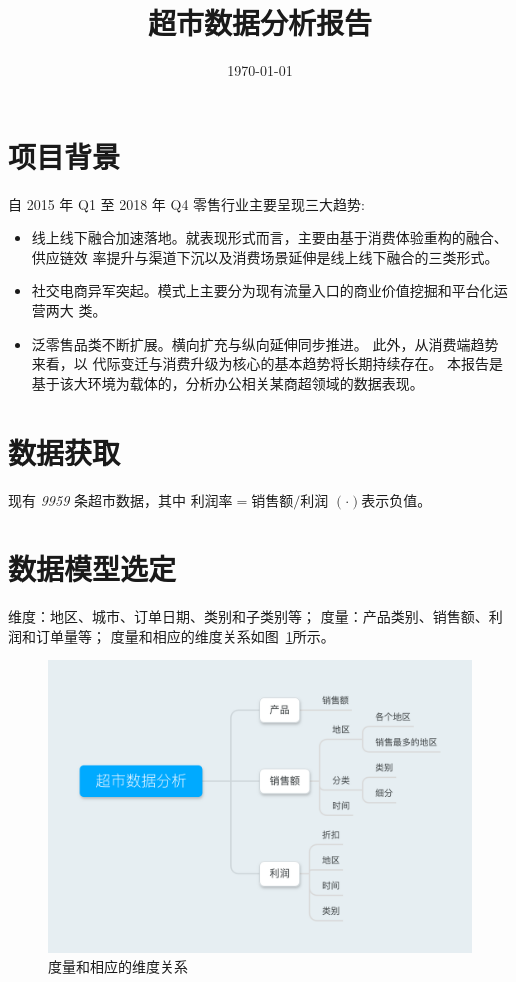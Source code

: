 \documentclass[a4paper]{ctexart}
\title{超市数据分析报告}
\author{}
\date{\today}
\begin{document}
\maketitle
\tableofcontents
\section{项目背景}
自 2015 年 Q1 至 2018 年 Q4 零售行业主要呈现三大趋势:
\begin{itemize}
    \item 线上线下融合加速落地。就表现形式而言，主要由基于消费体验重构的融合、供应链效
          率提升与渠道下沉以及消费场景延伸是线上线下融合的三类形式。
    \item 社交电商异军突起。模式上主要分为现有流量入口的商业价值挖掘和平台化运营两大
          类。
    \item 泛零售品类不断扩展。横向扩充与纵向延伸同步推进。 此外，从消费端趋势来看，以
          代际变迁与消费升级为核心的基本趋势将长期持续存在。
          本报告是基于该大环境为载体的，分析办公相关某商超领域的数据表现。
\end{itemize}


\section{数据获取}
现有 \emph{9959} 条超市数据，其中
$\text{利润率} = \text{销售额}/\text{利润}$
$(\cdot)$表示负值。


\section{数据模型选定}
维度：地区、城市、订单日期、类别和子类别等；
度量：产品类别、销售额、利润和订单量等；
度量和相应的维度关系如图~\ref{fig:mindmap}所示。
\begin{figure}[H]
    \centering
    \includegraphics[width=\textwidth]{figures/mindmap}
    \caption{度量和相应的维度关系}\label{fig:mindmap}
\end{figure}
\newpage
\end{document}
